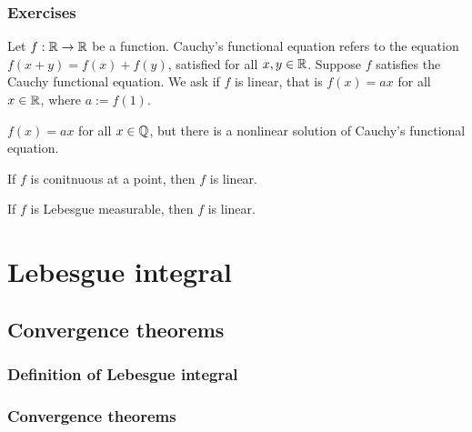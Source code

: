 \documentclass{../note}
\begin{document}
\section*{Exercises}
\begin{prb}
Let $f:\mathbb{R}\to\mathbb{R}$ be a function.
Cauchy's functional equation refers to the equation $f(x+y)=f(x)+f(y)$, satisfied for all $x,y\in\mathbb{R}$.
Suppose $f$ satisfies the Cauchy functional equation.
We ask if $f$ is linear, that is $f(x)=ax$ for all $x\in\mathbb{R}$, where $a:=f(1)$.
\begin{parts}
\item $f(x)=ax$ for all $x\in\mathbb{Q}$, but there is a nonlinear solution of Cauchy's functional equation.
\item If $f$ is conitnuous at a point, then $f$ is linear.
\item If $f$ is Lebesgue measurable, then $f$ is linear.
\end{parts}
\end{prb}











\part{Lebesgue integral}


\chapter{Convergence theorems}
\section{Definition of Lebesgue integral}
\section{Convergence theorems}


\begin{prb}
\end{prb}
\end{document}

